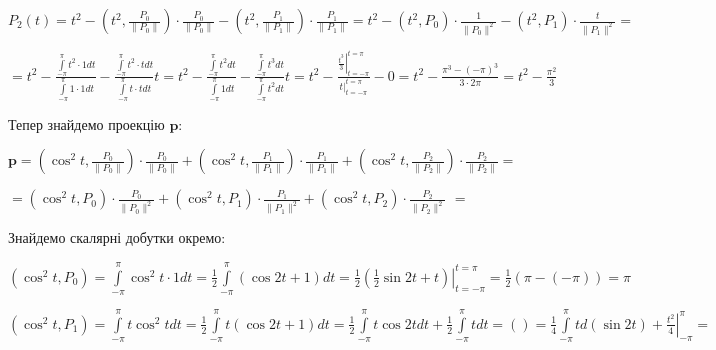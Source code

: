 \documentclass[a5paper, 20pt, titlepage]{article}
\newcommand{\p}{\textbf{p}}
\newcommand{\Int}[1]{\int \limits_{-\pi}^{\pi} #1 dt}
\begin{document}
\hspace{5mm}
$P_2(t) = t^2 - \left(t^2, \frac{P_0}{\| P_0 \|} \right) \cdot \frac{P_0}{\| P_0 \|}  -  \left(t^2, \frac{P_1}{\| P_1 \|} \right) \cdot \frac{P_1}{\| P_1 \|} = t^2 - \left(t^2, P_0 \right) \cdot \frac{1}{\| P_0 \|^2}  -  \left(t^2, P_1 \right) \cdot \frac{t}{\| P_1 \|^2} = $

\vspace{2mm}
\hspace{14mm}
$= t^2 - \frac{\int \limits_{-\pi}^{\pi} t^2 \cdot 1 dt}{\int \limits_{-\pi}^{\pi} 1 \cdot 1 dt} - \frac{\int \limits_{-\pi}^{\pi} t^2 \cdot t dt}{\int \limits_{-\pi}^{\pi} t \cdot t dt}t = 
t^2 - \frac{\int \limits_{-\pi}^{\pi} t^2 dt}{\int \limits_{-\pi}^{\pi} 1 dt} - \frac{\int \limits_{-\pi}^{\pi} t^3 dt}{\int \limits_{-\pi}^{\pi} t^2 dt} t
= t^2 - \frac{\left. \frac{t^3}{3} \right|_{t = -\pi}^{t = \pi}}{\left. t \right|_{t = - \pi}^{t = \pi}} - 0 = t^2 - \frac{\pi^3 - (-\pi)^3}{3\cdot 2 \pi} = t^2 - \frac{\pi^2}{3}$ 

\vspace{5mm}
Тепер знайдемо проекцію $\p$:

\vspace{5mm}
\hspace{4mm}
$\p = \left(\cos^2  t, \frac{P_0}{\|P_0 \|} \right) \cdot \frac{P_0}{\| P_0 \|} +  \left(\cos^2  t, \frac{P_1}{\|P_1 \|} \right) \cdot \frac{P_1}{\| P_1 \|} +
 \left(\cos^2  t, \frac{P_2}{\|P_2 \|} \right) \cdot \frac{P_2}{\| P_2 \|} =$

\vspace{3mm}
\hspace{7mm}
$= \left(\cos^2  t, P_0 \right) \cdot \frac{P_0}{\| P_0 \|^2} + \left(\cos^2  t, P_1 \right) \cdot \frac{P_1}{\| P_1 \|^2} + \left(\cos^2  t, P_2 \right) \cdot \frac{P_2}{\| P_2 \|^2} \,\, \boxed{=}$

\vspace{5mm}
Знайдемо скалярні добутки окремо:

\vspace{5mm}
\hspace{4mm}
$\left(\cos^2  t, P_0 \right) = \int \limits_{-\pi}^{\pi} \cos^2 t \cdot 1 dt = \frac{1}{2} \int \limits_{-\pi}^{\pi} (\cos 2t + 1) dt = \frac{1}{2} \left. \left( \frac{1}{2} \sin 2t + t \right) \right|_{t = -\pi}^{t = \pi} = \frac{1}{2} \left( \pi - (-\pi)\right) = \pi$

\vspace{3mm}
\hspace{4mm}
$\left(\cos^2  t, P_1 \right) = \int \limits_{-\pi}^{\pi} t \cos^2 t dt = \frac{1}{2} \Int{t(\cos 2t + 1)} = \frac{1}{2} \Int{t \cos 2t} + \frac{1}{2} \Int{t} = \left( \right) = 
\frac{1}{4} \int \limits_{-\pi}^{\pi} t d(\sin 2t) + \left. \frac{t^2}{4} \right|_{-\pi}^{\pi} = $
\end{document}
